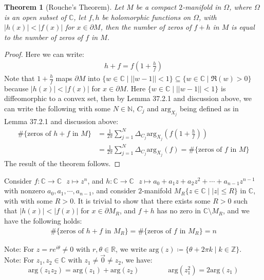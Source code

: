 \documentclass[15pt]{book}
\theoremstyle{break}
\theoremstyle{break}
\newtheorem{thm}{Theorem}[section]
\newcommand{\R}{\mathbb{R}}
\newcommand{\N}{\mathbb{N}}
\newcommand{\Z}{\mathbb{Z}}
\newcommand{\Complex}{\mathbb{C}}
\newcommand{\note}{\color{red}Note: \color{black}}
\begin{document}
\begin{thm}[Rouche's Theorem]
Let $M$ be a compact $2$-manifold in $\Omega$, where $\Omega$ is an open subset of $\Complex$, let $f, h$ be holomorphic functions on $\Omega$, with $|h(x)|< |f(x)|$ for $x\in\partial M$, then the number of zeros of $f+h$ in $M$ is equal to the number of zeros of $f$ in $M$.  
\end{thm}
\begin{proof}
Here we can write:
\begin{align*}
h + f = f\left( 1 + \frac{h}{f}\right)
\end{align*}
Note that $1+\frac{h}{f}$ maps $\partial M$ into $\{w \in \Complex \mid ||w - 1 || <1\}\subseteq \{ w \in \Complex \mid \Re(w) >0\}$ because $|h(x)|<|f(x)|$ for $x \in \partial M$. Here $\{w \in \Complex \mid ||w - 1 || <1\}$ is diffeomorphic to a convex set, then by Lemma 37.2.1 and discussion above, we can write the following with some $N \in \N$, $C_j$ and $\text{arg}_{X_j}$ being defined as in Lemma 37.2.1 and discussion above:
\begin{align*}
\# \{\text{zeros of }h+f\text{ in }M\} &= \frac{1}{2\pi}\sum_{j=1}^N \Delta_{ C_j}\text{arg}_{X_j}\left( f\left( 1+\frac{h}{f}\right)\right) \\
&= \frac{1}{2\pi} \sum_{j=1}^N \Delta_{C_j}\text{arg}_{X_j}(f) = \# \{\text{zeros of }f\text{ in }M\}
\end{align*}
The result of the theorem follows. 
\end{proof}
\newpage
Consider $f:\Complex \to \Complex \ \ \ z \mapsto z^n$, and $h:\Complex \to \Complex \ \ \ z\mapsto a_0 + a_1 z+ a_2 z^2 + \cdots + a_{n-1}z^{n-1}$ with nonzero $a_0, a_1,\cdots, a_{n-1}$, and consider $2$-manifold $M_R\{ z \in \Complex \mid |z| \leq R\}$ in $\Complex$, with with some $R>0$. It is trivial to show that there exists some $R >0$ such that $|h(x) | < |f(x)| $ for $x \in \partial M_R$, and $f+h$ has no zero in $\Complex \setminus M_R$, and we have the following holds:
\begin{align*}
\# \{\text{zeros of }h+f\text{ in }M_R\} = \# \{\text{zeros of }f\text{ in }M_R\} = n
\end{align*}

\note For $z =re^{i\theta} \neq 0$ with $r,\theta \in \R$, we write $\text{arg}(z) \coloneqq \{\theta + 2\pi k \mid k\in \Z\}$.\\
\note For $z_1,z_2 \in \Complex$ with $z_1\neq \vec{0}\neq z_2$, we have: 
$$\text{arg}(z_1z_2) = \text{arg}(z_1) + \text{arg}(z_2)\qquad\qquad\text{arg}(z_1^2) = 2\text{arg}(z_1)$$
\end{document}
